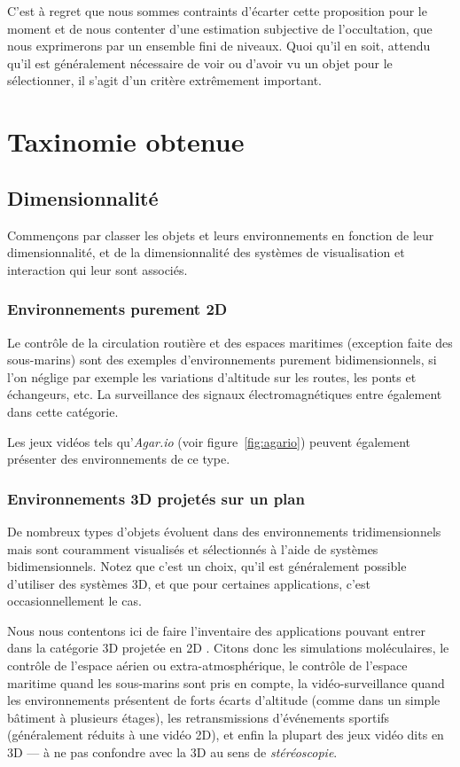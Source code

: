     C'est à regret que nous sommes contraints d'écarter cette proposition pour le moment et de nous contenter d'une estimation subjective de l'occultation, que nous exprimerons par un ensemble fini de niveaux. Quoi qu'il en soit, attendu qu'il est généralement nécessaire de voir ou d'avoir vu un objet pour le sélectionner, il s'agit d'un critère extrêmement important.

\section{Taxinomie obtenue}
	
	\subsection{Dimensionnalité}
	Commençons par classer les objets et leurs environnements en fonction de leur dimensionnalité, et de la dimensionnalité des systèmes de visualisation et interaction qui leur sont associés.
	
	\subsubsection{Environnements purement 2D}
	Le contrôle de la circulation routière et des espaces maritimes (exception faite des sous-marins) sont des exemples d'environnements purement bidimensionnels, si l'on néglige par exemple les variations d'altitude sur les routes, les ponts et échangeurs, etc. La surveillance des signaux électromagnétiques entre également dans cette catégorie.
	
	Les jeux vidéos tels qu'\emph{Agar.io} (voir figure~\ref{fig:agario}) peuvent également présenter des environnements de ce type.
	
	\subsubsection{Environnements 3D projetés sur un plan}
	De nombreux types d'objets évoluent dans des environnements tridimensionnels mais sont couramment visualisés et sélectionnés à l'aide de systèmes bidimensionnels. Notez que c'est un choix, qu'il est généralement possible d'utiliser des systèmes 3D, et que pour certaines applications, c'est occasionnellement le cas.
	
	Nous nous contentons ici de faire l'inventaire des applications pouvant entrer dans la catégorie \og 3D projetée en 2D \fg{}. Citons donc les simulations moléculaires, le contrôle de l'espace aérien ou extra-atmosphérique, le contrôle de l'espace maritime quand les sous-marins sont pris en compte, la vidéo-surveillance quand les environnements présentent de forts écarts d'altitude (comme dans un simple bâtiment à plusieurs étages), les retransmissions d'événements sportifs (généralement réduits à une vidéo 2D), et enfin la plupart des jeux vidéo dits \og en 3D \fg{} --- à ne pas confondre avec la 3D au sens de \emph{stéréoscopie}.
	
